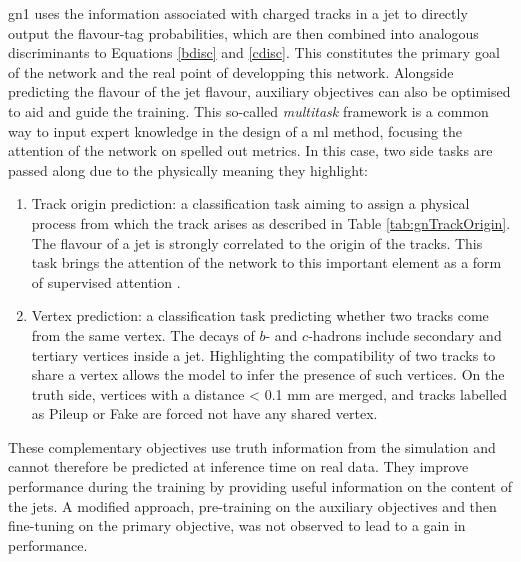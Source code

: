 \gls{gn1} uses the information associated with charged tracks in a jet to directly output the flavour-tag probabilities, which are then combined into analogous discriminants to Equations \ref{bdisc} and \ref{cdisc}. This constitutes the primary goal of the network and the real point of developping this network. Alongside predicting the flavour of the jet flavour, auxiliary objectives can also be optimised to aid and guide the training. This so-called \textit{multitask} framework is a common way to input expert knowledge in the design of a \gls{ml} method, focusing the attention of the network on spelled out metrics. In this case, two side tasks are passed along due to the physically meaning they highlight:
\begin{enumerate}
\item Track origin prediction: a classification task aiming to assign a physical process from which the track arises as described in Table \ref{tab:gnTrackOrigin}. The flavour of a jet is strongly correlated to the origin of the tracks. This task brings the attention of the network to this important element as a form of supervised attention \cite{hwang2021selfsupervised}.
\item Vertex prediction: a classification task predicting whether two tracks come from the same vertex. The decays of $b$- and $c$-hadrons include secondary and tertiary vertices inside a jet. Highlighting the compatibility of two tracks to share  a vertex allows the model to infer the presence of such vertices. On the truth side, vertices with a distance < 0.1 mm are merged, and tracks labelled as Pileup or Fake are forced not have any shared vertex.
\end{enumerate}
These complementary objectives use truth information from the simulation and cannot therefore be predicted at inference time on real data. They improve performance during the training by providing useful information on the content of the jets.  A modified approach, pre-training on the auxiliary objectives and then fine-tuning on the primary objective, was not observed to lead to a gain in performance. \\

